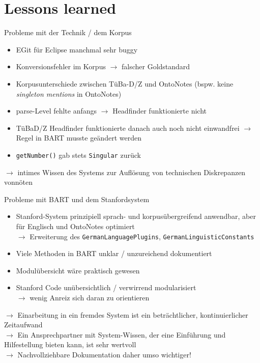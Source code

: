 \documentclass[11pt,a4paper]{beamer}
\begin{document}
\section{Lessons learned}
\begin{frame}{Probleme mit der Technik / dem Korpus}
\begin{itemize}
\item EGit für Eclipse manchmal sehr buggy
\item Konversionsfehler im Korpus $\rightarrow$ falscher Goldstandard
\item Korpusunterschiede zwischen TüBa-D/Z und OntoNotes (bspw. keine \textit{singleton mentions} in OntoNotes)
\item parse-Level fehlte anfangs $\rightarrow$ Headfinder funktionierte nicht
\item TüBaD/Z Headfinder funktionierte danach auch noch nicht einwandfrei $\rightarrow$ Regel in BART musste geändert werden
\item \texttt{getNumber()} gab stets \texttt{Singular} zurück
\end{itemize}
$\rightarrow$ intimes Wissen des Systems zur Auflösung von technischen Diskrepanzen vonnöten

\end{frame}

\begin{frame}{Probleme mit BART und dem Stanfordsystem}
\begin{itemize}
\item Stanford-System prinzipiell sprach- und korpusübergreifend anwendbar, aber für Englisch und OntoNotes optimiert\\
$\rightarrow$ Erweiterung des \texttt{GermanLanguagePlugins}, \texttt{GermanLinguisticConstants}
\item Viele Methoden in BART unklar / unzureichend dokumentiert
\item Modulübersicht wäre praktisch gewesen
\item Stanford Code unübersichtlich / verwirrend modularisiert\\$\rightarrow$ wenig Anreiz sich daran zu orientieren
\end{itemize}
$\rightarrow$ Einarbeitung in ein fremdes System ist ein beträchtlicher, kontinuierlicher Zeitaufwand\\
$\rightarrow$ Ein Ansprechpartner mit System-Wissen, der eine Einführung und Hilfestellung bieten kann, ist sehr wertvoll\\
$\rightarrow$ Nachvollziehbare Dokumentation daher umso wichtiger!
\end{frame}
\end{document}
